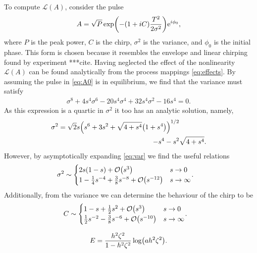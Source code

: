 \documentclass[10pt,twocolumn,a4paper]{article}
\let\originalleft\left
\let\originalright\right
\renewcommand{\left}{\mathopen{}\mathclose\bgroup\originalleft}
\renewcommand{\right}{\aftergroup\egroup\originalright}
\providecommand{\bigO}[1]{\ensuremath{\mathop{}\mathopen{}\mathcal{O}\mathopen{}\left(#1\right)}}
\begin{document}
To compute $\mathcal{L}(A)$, consider the pulse
\begin{align}
A = \sqrt{P} \exp \left( -(1 + iC) \frac{T^2}{2 \sigma^2} \right) \textrm{e}^{i \phi_0},
\label{eq:A0}
\end{align}
where $P$ is the peak power, $C$ is the chirp, $\sigma^2$ is the variance, and $\phi_0$ is the initial phase. This form is chosen because it resembles the envelope and linear chirping found by experiment ***cite. Having neglected the effect of the nonlinearity $\mathcal{L}(A)$ can be found analytically from the process mappings \eqref{eq:effects}. By assuming the pulse in \eqref{eq:A0} is in equilibrium, we find that the variance must satisfy
\begin{align}
\sigma^8 + 4 s^4 \sigma^6 - 20 s^4 \sigma^4 + 32 s^4 \sigma^2 - 16 s^4 = 0.
\label{eq:var}
\end{align}
As this expression is a quartic in $\sigma^2$ it too has an analytic solution, namely,
\begin{equation}
\begin{split}
\sigma^2 = \sqrt{2} s \left( s^6 + 3s^2 + \sqrt{4 + s^4} \left( 1 + s^4 \right) \right)^{1/2} & \\
- s^4 - s^2 & \sqrt{4 + s^4}.
\label{eq:equilvar}
\end{split}
\end{equation}
However, by asymptotically expanding \eqref{eq:var} we find the useful relations
\begin{align}
\sigma^2 &\sim
\begin{cases}
2s(1 - s) + \bigO{s^3} & s \rightarrow 0 \\
1 - \frac{1}{4}s^{-4} + \frac{3}{8}s^{-8} + \bigO{s^{-12}} & s \rightarrow \infty
\end{cases}.
\end{align}
Additionally, from the variance we can determine the behaviour of the chirp to be
\begin{align}
C &\sim
\begin{cases}
1 - s + \frac{1}{2}s^2 + \bigO{s^3} & s \rightarrow 0 \\
\frac{1}{2}s^{-2} - \frac{3}{8}s^{-6} + \bigO{s^{-10}} & s \rightarrow \infty
\end{cases}.
\end{align}




\begin{align}
E = \frac{h^2 \zeta^2}{1 - h^2 \zeta^2} \log \left( a h^2 \zeta^2 \right). \\
\end{align}
\end{document}
